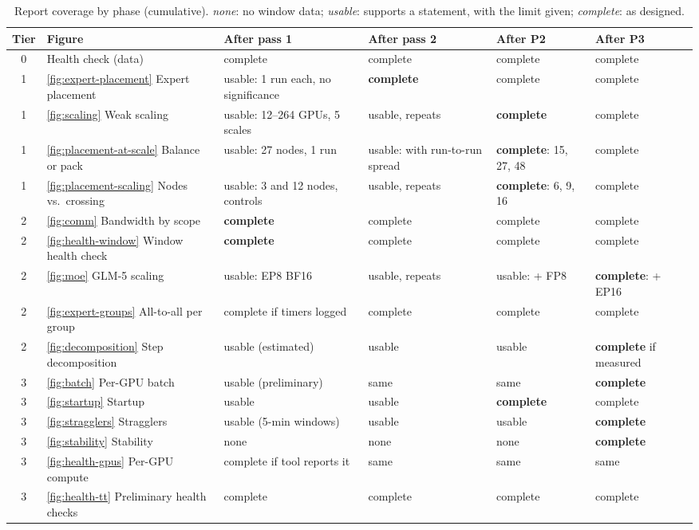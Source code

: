 \begin{table}[h]
  \caption{Report coverage by phase (cumulative). \emph{none}: no window data; \emph{usable}: supports a
    statement, with the limit given; \emph{complete}: as designed.}
  \label{tab:coverage}
  \centering\footnotesize
  \setlength{\tabcolsep}{3pt}
  \begin{tabular}{c>{\raggedright}p{3.1cm}>{\raggedright}p{2.35cm}>{\raggedright}p{2.35cm}>{\raggedright}p{2.2cm}>{\raggedright\arraybackslash}p{2.0cm}}
    \toprule
    Tier & Figure & After pass 1 & After pass 2 & After P2 & After P3 \\
    \midrule
    0 & Health check (data) & complete & complete & complete & complete \\
    1 & \ref{fig:expert-placement} Expert placement & usable: 1 run each, no significance & \textbf{complete} & complete & complete \\
    1 & \ref{fig:scaling} Weak scaling & usable: 12--264 GPUs, 5 scales & usable, repeats & \textbf{complete} & complete \\
    1 & \ref{fig:placement-at-scale} Balance or pack & usable: 27 nodes, 1 run & usable: with run-to-run spread & \textbf{complete}: 15, 27, 48 & complete \\
    1 & \ref{fig:placement-scaling} Nodes vs.\ crossing & usable: 3 and 12 nodes, controls & usable, repeats & \textbf{complete}: 6, 9, 16 & complete \\
    2 & \ref{fig:comm} Bandwidth by scope & \textbf{complete} & complete & complete & complete \\
    2 & \ref{fig:health-window} Window health check & \textbf{complete} & complete & complete & complete \\
    2 & \ref{fig:moe} GLM-5 scaling & usable: EP8 BF16 & usable, repeats & usable: + FP8 & \textbf{complete}: + EP16 \\
    2 & \ref{fig:expert-groups} All-to-all per group & complete if timers logged & complete & complete & complete \\
    2 & \ref{fig:decomposition} Step decomposition & usable (estimated) & usable & usable & \textbf{complete} if measured \\
    3 & \ref{fig:batch} Per-GPU batch & usable (preliminary) & same & same & \textbf{complete} \\
    3 & \ref{fig:startup} Startup & usable & usable & \textbf{complete} & complete \\
    3 & \ref{fig:stragglers} Stragglers & usable (5-min windows) & usable & usable & \textbf{complete} \\
    3 & \ref{fig:stability} Stability & none & none & none & \textbf{complete} \\
    3 & \ref{fig:health-gpus} Per-GPU compute & complete if tool reports it & same & same & same \\
    3 & \ref{fig:health-tt} Preliminary health checks & complete & complete & complete & complete \\
    \bottomrule
  \end{tabular}
\end{table}

